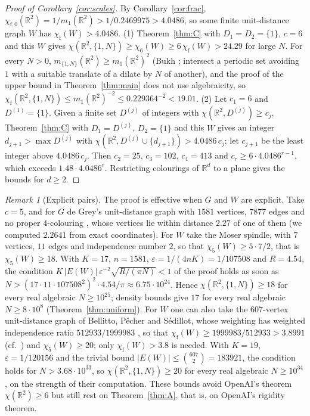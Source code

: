 \documentclass[11pt,a4paper]{amsart}
\theoremstyle{definition}
\theoremstyle{remark}
\newtheorem*{remark}{Remark}
\newcommand{\R}{\mathbb{R}}
\newcommand{\chif}{\chi_{\mathrm f}}
\begin{document}
\begin{proof}[Proof of Corollary~\ref{cor:scales}]
By Corollary~\ref{cor:frac}, $\chi_{\mathrm f,0}(\R^2)=1/m_1(\R^2)>1/0.2469975>4.0486$, so some finite unit-distance
graph $W$ has $\chif(W)>4.0486$. (1) Theorem~\ref{thm:C} with $D_1=D_2=\{1\}$, $c=6$ \cite{OpenAI} and this $W$ gives
$\chi(\R^2,\{1,N\})\ge\chi_6(W)\ge6\,\chif(W)>24.29$ for large $N$. For every $N>0$, $m_{\{1,N\}}(\R^2)\ge m_1(\R^2)^2$ (Bukh
\cite{Bukh}; intersect a periodic set avoiding $1$ with a suitable translate of a dilate by $N$ of another), and the
proof of the upper bound in Theorem~\ref{thm:main} does not use algebraicity, so
$\chif(\R^2,\{1,N\})\le m_1(\R^2)^{-2}\le0.229364^{-2}<19.01$. (2) Let $c_1=6$ and $D^{(1)}=\{1\}$. Given a finite
set $D^{(j)}$ of integers with $\chi(\R^2,D^{(j)})\ge c_j$, Theorem~\ref{thm:C} with $D_1=D^{(j)}$, $D_2=\{1\}$ and
this $W$ gives an integer $d_{j+1}>\max D^{(j)}$ with $\chi(\R^2,D^{(j)}\cup\{d_{j+1}\})>4.0486\,c_j$; let $c_{j+1}$ be
the least integer above $4.0486\,c_j$. Then $c_2=25$, $c_3=102$, $c_4=413$ and $c_r\ge6\cdot4.0486^{r-1}$, which
exceeds $1.48\cdot4.0486^r$. Restricting colourings of $\R^d$ to a plane gives the bounds for $d\ge2$.
\end{proof}

\begin{remark}[Explicit pairs]\label{rem:explicit}
The proof is effective when $G$ and $W$ are explicit. Take $c=5$, and for $G$ de Grey's unit-distance graph with
$1581$ vertices, $7877$ edges and no proper $4$-colouring \cite{deGrey}, whose vertices lie within distance $2.27$ of
one of them (we computed $2.2641$ from exact coordinates). For $W$ take the Moser spindle, with $7$ vertices, $11$
edges and independence number $2$, so that $\chi_5(W)\ge5\cdot7/2$, that is $\chi_5(W)\ge18$. With $K=17$,
$n=1581$, $\varepsilon=1/(4nK)=1/107508$ and $R=4.54$, the condition $K\,|E(W)|\,\varepsilon^{-2}\sqrt{R/(\pi N)}<1$
of the proof holds as soon as $N>(17\cdot11\cdot107508^2)^2\cdot4.54/\pi\approx6.75\cdot10^{24}$. Hence
$\chi(\R^2,\{1,N\})\ge18$ for every real algebraic $N\ge10^{25}$; density bounds give $17$ for every real algebraic
$N\ge8\cdot10^8$ (Theorem~\ref{thm:uniform}). For $W$ one can also take the $607$-vertex unit-distance graph of Bellitto,
P\^echer and S\'edillot, whose weighting has weighted independence ratio $512933/1999983$ \cite[§4.4]{BPS}, so that
$\chif(W)\ge1999983/512933>3.8991$ (cf.\ \cite[Thm.~2]{BPS}) and $\chi_5(W)\ge20$; only $\chif(W)>3.8$ is needed.
With $K=19$, $\varepsilon=1/120156$ and the trivial bound $|E(W)|\le\binom{607}{2}=183921$, the condition holds for
$N>3.68\cdot10^{33}$, so $\chi(\R^2,\{1,N\})\ge20$ for every real algebraic $N\ge10^{34}$, on the strength of their
computation. These bounds avoid OpenAI's theorem $\chi(\R^2)\ge6$ but still rest on Theorem~\ref{thm:A}, that is, on
OpenAI's rigidity theorem.
\end{remark}
\end{document}
